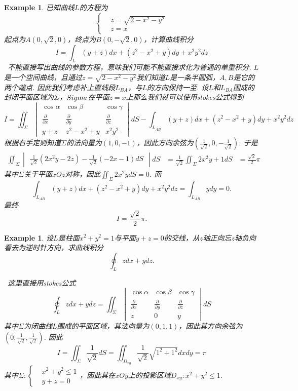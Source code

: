 \documentclass{article}
\newtheorem{example}[theorem]{Example}
\newcommand{\hints}{{\color{blue} \text{hints}}}
\begin{document}
\begin{example}
\rm 已知曲线$L$的方程为
$$
\left\{
\begin{aligned}
&z = \sqrt{2-x^2-y^2} \\
&z = x
\end{aligned}\right. 
$$
起点为$A(0,\sqrt{2},0)$，终点为$B(0,-\sqrt{2},0)$，计算曲线积分
$$
I = \int_L (y+z)dx+(z^2-x^2+y)dy+x^2y^2dz
$$
\hints\ 不能直接写出曲线的参数方程，意味我们可能不能直接求化为普通的单重积分. $L$是一个空间曲线，且通过$z=\sqrt{2-x^2-y^2}$我们知道$L$是一条半圆弧，$A,B$是它的两个端点. 因此我们考虑补上直线段$L_{BA}$，与$L$的方向保持一至. 设$L$和$L_{BA}$围成的封闭平面区域为$\Sigma$，$\\Sigma$在平面$z=x$上那么我们就可以使用stokes公式得到
$$
I=\iint_\Sigma \begin{vmatrix}
\cos \alpha & \cos \beta & \cos \gamma \\
\frac{\partial}{\partial x} & \frac{\partial}{\partial y} & \frac{\partial}{\partial z} \\
y+z & z^2-x^2+y & x^2y^2 
\end{vmatrix}dS-\int_{L_{AB}} (y+z)dx+(z^2-x^2+y)dy+x^2y^2dz
$$
根据右手定则知道$\Sigma$的法向量为$(1,0,-1)$，因此方向余弦为$(\frac{1}{\sqrt{2}},0,-\frac{1}{\sqrt{2}})$. 于是
$$
\begin{aligned}
\iint_\Sigma \begin{vmatrix}
\frac{1}{\sqrt{2}}(2x^2y -2z) - \frac{1}{\sqrt{2}}(-2x-1)dS
\end{vmatrix}dS &= \frac{1}{\sqrt{2}} \iint_\Sigma 2x^2y +1 dS 
&= \frac{\sqrt{2}}{2}\pi
\end{aligned}
$$
其中$\Sigma$关于平面$xOz$对称，因此$\iint_\Sigma 2x^2ydS = 0$. 而
$$
\int_{L_{AB}} (y+z)dx+(z^2-x^2+y)dy+x^2y^2dz = \int_{L_{AB}} ydy = 0.
$$
最终
$$
I = \frac{\sqrt{2}}{2}\pi. 
$$
\end{example}


\begin{example}
\rm 设$L$是柱面$x^2+y^2=1$与平面$y+z=0$的交线，从$z$轴正向忘$z$轴负向看去为逆时针方向，求曲线积分
$$
\oint_L zdx + ydz.
$$

\hints\ 这里直接用stokes公式
$$
\oint_L zdx + ydz = \iint_\Sigma \begin{vmatrix}
\cos \alpha & \cos \beta & \cos \gamma \\
\frac{\partial}{\partial x} & \frac{\partial}{\partial y} & \frac{\partial}{\partial z} \\
z & 0 & y 
\end{vmatrix}dS
$$
其中$\Sigma$为闭曲线$L$围成的平面区域，其法向量为$(0,1,1)$，因此其方向余弦为$(0,\frac{1}{\sqrt{2}},\frac{1}{\sqrt{2}})$. 因此
$$
I = \iint_\Sigma \frac{1}{\sqrt{2}}dS=  \iint_{D_{xy}} \frac{1}{\sqrt{2}} \sqrt{1^2 + 1^2}dxdy = \pi
$$
其中$\Sigma: \left\{ \begin{aligned} &x^2+y^2 \leq 1 \\ &y+z = 0  \end{aligned} \right.$，因此其在$xOy$上的投影区域$D_{xy}: x^2+y^2 \leq 1$. 
\end{example}
\end{document}
